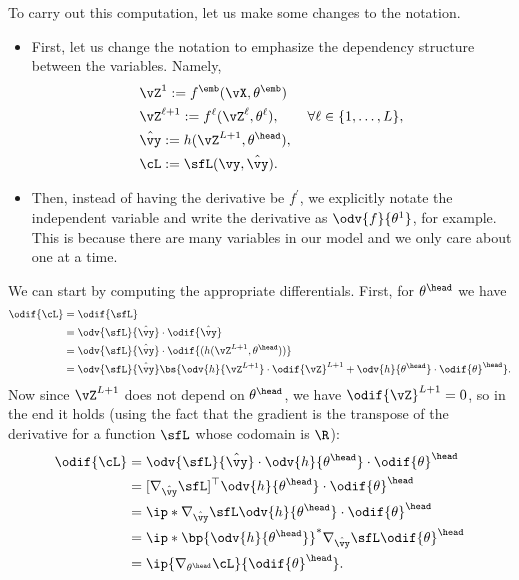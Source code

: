 \documentclass[../../book-main.tex]{subfiles}
\begin{document}
To carry out this computation, let us make some changes to the notation. 
\begin{itemize}
    \item First, let us change the notation to emphasize the dependency structure between the variables. Namely, 
    \begin{align}
        &\vZ^{1} := f^{\emb}(\vX, \theta^{\emb}) \\ 
        &\vZ^{\ell + 1} := f^{\ell}(\vZ^{\ell}, \theta^{\ell}), \qquad \forall \ell \in \{1, \dots, L\}, \\
        &\hat{\vy} := h(\vZ^{L+1}, \theta^{\head}), \\ 
        &\cL := \sfL(\vy, \hat{\vy}).
    \end{align}
    \item Then, instead of having the derivative be \(f^{\prime}\), we explicitly notate the independent variable and write the derivative as \(\odv{f}{\theta^{1}}\), for example. This is because there are many variables in our model and we only care about one at a time.
\end{itemize}
We can start by computing the appropriate differentials. First, for \(\theta^{\head}\) we have
\begin{align}
    \odif{\cL}
    &= \odif{\sfL} \\ 
    &= \odv{\sfL}{\hat{\vy}}\cdot\odif{\hat{\vy}} \\ 
    &= \odv{\sfL}{\hat{\vy}}\cdot\odif{{(h(\vZ^{L + 1}, \theta^{\head}))}} \\ 
    &= \odv{\sfL}{\hat{\vy}}\bs{\odv{h}{\vZ^{L + 1}}\cdot\odif{\vZ}^{L + 1} + \odv{h}{\theta^{\head}}\cdot\odif{\theta}^{\head}}.
\end{align}
Now since \(\vZ^{L + 1}\) does not depend on \(\theta^{\head}\), we have \(\odif{\vZ}^{L + 1} = 0\), so in the end it holds (using the fact that the gradient is the transpose of the derivative for a function \(\sfL\) whose codomain is \(\R\)):
\begin{align}
    \odif{\cL} 
    &= \odv{\sfL}{\hat{\vy}}\cdot\odv{h}{\theta^{\head}}\cdot\odif{\theta}^{\head} \\ 
    &= [\nabla_{\hat{\vy}}\sfL]^{\top}\odv{h}{\theta^{\head}}\cdot\odif{\theta}^{\head} \\ 
    &= \ip*{\nabla_{\hat{\vy}}\sfL}{\odv{h}{\theta^{\head}}\cdot\odif{\theta}^{\head}} \\
    &= \ip*{\bp{\odv{h}{\theta^{\head}}}^{*}\nabla_{\hat{\vy}}\sfL}{\odif{\theta}^{\head}} \\ 
    &= \ip{\nabla_{\theta^{\head}}\cL}{\odif{\theta}^{\head}}.
\end{align}
\end{document}
